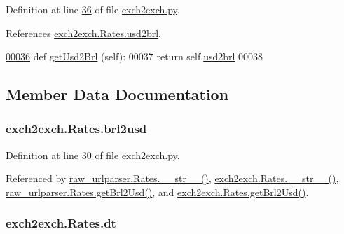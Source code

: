 Definition at line \hyperlink{exch2exch_8py_source_l00036}{36} of file \hyperlink{exch2exch_8py_source}{exch2exch.\+py}.



References \hyperlink{exch2exch_8py_source_l00029}{exch2exch.\+Rates.\+usd2brl}.


\begin{DoxyCode}
\hypertarget{classexch2exch_1_1_rates.tex_l00036}{}\hyperlink{classexch2exch_1_1_rates_af5f9e36738bb2288ac39a8bca48b4282}{00036}     \textcolor{keyword}{def }\hyperlink{classexch2exch_1_1_rates_af5f9e36738bb2288ac39a8bca48b4282}{getUsd2Brl} (self):
00037         \textcolor{keywordflow}{return} self.\hyperlink{classexch2exch_1_1_rates_ab79ad6e4a42ca358e6b39c825a4b8a0b}{usd2brl}
00038     
\end{DoxyCode}


\subsection{Member Data Documentation}
\subsubsection[{\texorpdfstring{brl2usd}{brl2usd}}]{\setlength{\rightskip}{0pt plus 5cm}exch2exch.\+Rates.\+brl2usd}\hypertarget{classexch2exch_1_1_rates_acc018dea09e825e18e91c73c5c63ab78}{}\label{classexch2exch_1_1_rates_acc018dea09e825e18e91c73c5c63ab78}


Definition at line \hyperlink{exch2exch_8py_source_l00030}{30} of file \hyperlink{exch2exch_8py_source}{exch2exch.\+py}.



Referenced by \hyperlink{raw__urlparser_8py_source_l00038}{raw\+\_\+urlparser.\+Rates.\+\_\+\+\_\+str\+\_\+\+\_\+()}, \hyperlink{exch2exch_8py_source_l00042}{exch2exch.\+Rates.\+\_\+\+\_\+str\+\_\+\+\_\+()}, \hyperlink{raw__urlparser_8py_source_l00029}{raw\+\_\+urlparser.\+Rates.\+get\+Brl2\+Usd()}, and \hyperlink{exch2exch_8py_source_l00033}{exch2exch.\+Rates.\+get\+Brl2\+Usd()}.

\subsubsection[{\texorpdfstring{dt}{dt}}]{\setlength{\rightskip}{0pt plus 5cm}exch2exch.\+Rates.\+dt}\hypertarget{classexch2exch_1_1_rates_acb12f83bce4393714ec30351a1d636c2}{}\label{classexch2exch_1_1_rates_acb12f83bce4393714ec30351a1d636c2}


